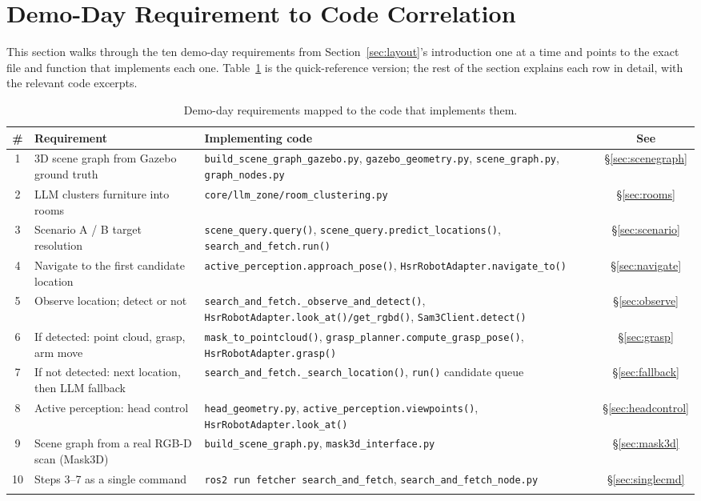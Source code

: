 \documentclass[11pt]{article}
\begin{document}
\section{Demo-Day Requirement to Code Correlation}
\label{sec:correlation}

This section walks through the ten demo-day requirements from
Section~\ref{sec:layout}'s introduction one at a time and points to the
exact file and function that implements each one. Table~\ref{tab:correlation}
is the quick-reference version; the rest of the section explains each row in
detail, with the relevant code excerpts.

\begin{center}
\begin{longtable}{c p{4.6cm} p{7.4cm} c}
\toprule
\textbf{\#} & \textbf{Requirement} & \textbf{Implementing code} & \textbf{See} \\
\midrule
\endhead
1 & 3D scene graph from Gazebo ground truth &
  \texttt{build\_scene\_graph\_gazebo.py}, \texttt{gazebo\_geometry.py},
  \texttt{scene\_graph.py}, \texttt{graph\_nodes.py} & \S\ref{sec:scenegraph} \\
2 & LLM clusters furniture into rooms &
  \texttt{core/llm\_zone/room\_clustering.py} & \S\ref{sec:rooms} \\
3 & Scenario A / B target resolution &
  \texttt{scene\_query.query()}, \texttt{scene\_query.predict\_locations()},
  \texttt{search\_and\_fetch.run()} & \S\ref{sec:scenario} \\
4 & Navigate to the first candidate location &
  \texttt{active\_perception.approach\_pose()},
  \texttt{HsrRobotAdapter.navigate\_to()} & \S\ref{sec:navigate} \\
5 & Observe location; detect or not &
  \texttt{search\_and\_fetch.\_observe\_and\_detect()},
  \texttt{HsrRobotAdapter.look\_at()/get\_rgbd()}, \texttt{Sam3Client.detect()}
  & \S\ref{sec:observe} \\
6 & If detected: point cloud, grasp, arm move &
  \texttt{mask\_to\_pointcloud()}, \texttt{grasp\_planner.compute\_grasp\_pose()},
  \texttt{HsrRobotAdapter.grasp()} & \S\ref{sec:grasp} \\
7 & If not detected: next location, then LLM fallback &
  \texttt{search\_and\_fetch.\_search\_location()},
  \texttt{run()} candidate queue & \S\ref{sec:fallback} \\
8 & Active perception: head control &
  \texttt{head\_geometry.py}, \texttt{active\_perception.viewpoints()},
  \texttt{HsrRobotAdapter.look\_at()} & \S\ref{sec:headcontrol} \\
9 & Scene graph from a real RGB-D scan (Mask3D) &
  \texttt{build\_scene\_graph.py}, \texttt{mask3d\_interface.py} &
  \S\ref{sec:mask3d} \\
10 & Steps 3--7 as a single command &
  \texttt{ros2 run fetcher search\_and\_fetch}, \texttt{search\_and\_fetch\_node.py}
  & \S\ref{sec:singlecmd} \\
\bottomrule
\caption{Demo-day requirements mapped to the code that implements them.}
\label{tab:correlation}
\end{longtable}
\end{center}
\end{document}
